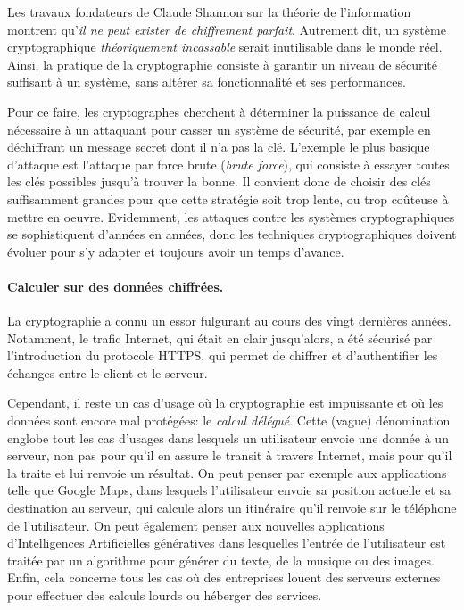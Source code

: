 Les travaux fondateurs de Claude Shannon sur la théorie de l'information montrent qu'\textit{il ne peut exister de chiffrement parfait}. Autrement dit, un système cryptographique \textit{théoriquement incassable} serait inutilisable dans le monde réel. Ainsi, la pratique de la cryptographie consiste à garantir un niveau de sécurité suffisant à un système, sans altérer sa fonctionnalité et ses performances.

Pour ce faire, les cryptographes cherchent à déterminer la puissance de calcul nécessaire à un attaquant pour casser un système de sécurité, par exemple en déchiffrant un message secret dont il n'a pas la clé. L'exemple le plus basique d'attaque est l'attaque par force brute (\textit{brute force}), qui consiste à essayer toutes les clés possibles jusqu'à trouver la bonne. Il convient donc de choisir des clés suffisamment grandes pour que cette stratégie soit trop lente, ou trop coûteuse à mettre en oeuvre. Evidemment, les attaques contre les systèmes cryptographiques se sophistiquent d'années en années, donc les techniques cryptographiques doivent évoluer pour s'y adapter et toujours avoir un temps d'avance.



\paragraph{Calculer sur des données chiffrées.}
La cryptographie a connu un essor fulgurant au cours des vingt dernières années. Notamment, le trafic Internet, qui était en clair jusqu'alors, a été sécurisé par l'introduction du protocole HTTPS, qui permet de chiffrer et d'authentifier les échanges entre le client et le serveur.

Cependant, il reste un cas d'usage où la cryptographie est impuissante et où les données sont encore mal protégées: le \textit{calcul délégué}. Cette (vague) dénomination englobe tout les cas d'usages dans lesquels un utilisateur envoie une donnée à un serveur, non pas pour qu'il en assure le transit à travers Internet, mais pour qu'il la traite et lui renvoie un résultat. On peut penser par exemple aux applications telle que Google Maps, dans lesquels l'utilisateur envoie sa position actuelle et sa destination au serveur, qui calcule alors un itinéraire qu'il renvoie sur le téléphone de  l'utilisateur. On peut également penser aux nouvelles applications d'Intelligences Artificielles génératives dans lesquelles l'entrée de l'utilisateur est traitée par un algorithme pour générer du texte, de la musique ou des images. Enfin, cela concerne tous les cas où des entreprises louent des serveurs externes pour effectuer des calculs lourds ou héberger des services.

